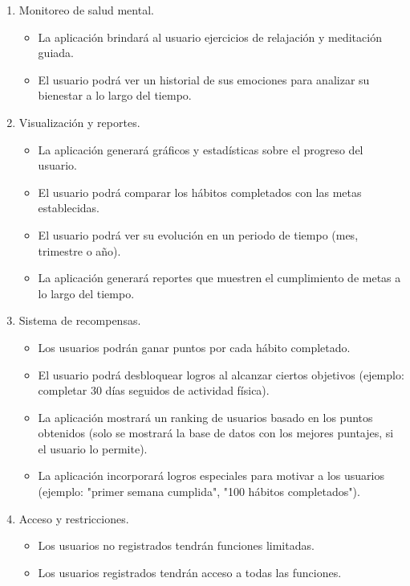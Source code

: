 \documentclass[letterpaper,12pt,oneside]{article}
\begin{document}
\begin{enumerate}
            \item Monitoreo de salud mental.
                \begin{itemize}
                    \item La aplicación brindará al usuario ejercicios de relajación y meditación guiada.
                    \item El usuario podrá ver un historial de sus emociones para analizar su bienestar a lo largo del tiempo.
                \end{itemize}
            \item Visualización y reportes.
                \begin{itemize}
                    \item La aplicación generará gráficos y estadísticas sobre el progreso del usuario.
                    \item El usuario podrá comparar los hábitos completados con las metas establecidas.
                    \item El usuario podrá ver su evolución en un periodo de tiempo (mes, trimestre o año).
                    \item La aplicación generará reportes que muestren el cumplimiento de metas a lo largo del tiempo.
                \end{itemize}
            \item Sistema de recompensas.
                \begin{itemize}
                    \item Los usuarios podrán ganar puntos por cada hábito completado.
                    \item El usuario podrá desbloquear logros al alcanzar ciertos objetivos (ejemplo: completar 30 días seguidos de actividad física).
                    \item La aplicación mostrará un ranking de usuarios basado en los puntos obtenidos (solo se mostrará la base de datos con los mejores puntajes, si el usuario lo permite).
                    \item La aplicación incorporará logros especiales para motivar a los usuarios (ejemplo: "primer semana cumplida", "100 hábitos completados").
                \end{itemize}
            \item Acceso y restricciones.
                \begin{itemize}
                    \item Los usuarios no registrados tendrán funciones limitadas.
                    \item Los usuarios registrados tendrán acceso a todas las funciones.
                \end{itemize}
        \end{enumerate}
        
\end{document}
